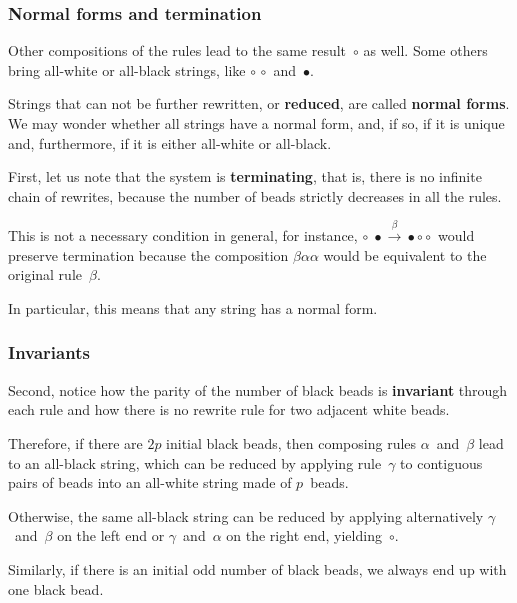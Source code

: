 \documentclass[compress,dvipdfmx]{beamer}
\begin{document}
\begin{frame}
  \frametitle{Normal forms and termination}

  Other compositions of the rules lead to the same result~\(\circ\) as
  well. Some others bring all\hyp{}white or all\hyp{}black strings,
  like \(\circ \, \circ\) and~\(\bullet\).

  \bigskip

  Strings that can not be further rewritten, or \textbf{reduced}, are
  called \textbf{normal forms}. We may wonder whether all strings have
  a normal form, and, if so, if it is unique and, furthermore, if it
  is either all\hyp{}white or all\hyp{}black.

  \bigskip

  First, let us note that the system is \textbf{terminating}, that is,
  there is no infinite chain of rewrites, because the number of beads
  strictly decreases in all the rules.

  \bigskip

  This is not a necessary condition in general, for instance, \(\circ
  \; \bullet \xrightarrow{\beta} \bullet \circ \circ\) would preserve
  termination because the composition \(\beta\alpha\alpha\) would be
  equivalent to the original rule~\(\beta\).

  \bigskip

  In particular, this means that any string has a normal form.

\end{frame}


\begin{frame}
  \frametitle{Invariants}

  Second, notice how the parity of the number of black beads is
  \textbf{invariant} through each rule and how there is no rewrite
  rule for two adjacent white beads.

  \bigskip

  Therefore, if there are \(2p\) initial black beads, then composing
  rules \(\alpha\)~and~\(\beta\) lead to an all\hyp{}black string,
  which can be reduced by applying rule~\(\gamma\) to contiguous pairs
  of beads into an all\hyp{}white string made of \(p\)~beads.

  \bigskip

  Otherwise, the same all\hyp{}black string can be reduced by applying
  alternatively \(\gamma\)~and~\(\beta\) on the left end or
  \(\gamma\)~and~\(\alpha\) on the right end, yielding~\(\circ\).

  \bigskip

  Similarly, if there is an initial odd number of black beads, we
  always end up with one black bead.

\end{frame}
\end{document}
